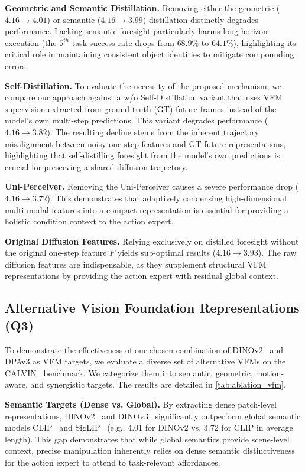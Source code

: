 \documentclass[runningheads]{llncs}
\begin{document}
\noindent \textbf{Geometric and Semantic Distillation.} 
Removing either the geometric ($4.16 \rightarrow 4.01$) or semantic ($4.16 \rightarrow 3.99$) distillation distinctly degrades performance. Lacking semantic foresight particularly harms long-horizon execution (the $5^{th}$ task success rate drops from $68.9\%$ to $64.1\%$), highlighting its critical role in maintaining consistent object identities to mitigate compounding errors.

\noindent \textbf{Self-Distillation.} To evaluate the necessity of the proposed mechanism, we compare our approach against a w/o Self-Distillation variant that uses VFM supervision extracted from ground-truth (GT) future frames instead of the model's own multi-step predictions. This variant degrades performance ($4.16 \rightarrow 3.82$). The resulting decline stems from the inherent trajectory misalignment between noisy one-step features and GT future representations, highlighting that self-distilling foresight from the model's own predictions is crucial for preserving a shared diffusion trajectory.

\noindent \textbf{Uni-Perceiver.} 
Removing the Uni-Perceiver causes a severe performance drop ($4.16 \rightarrow 3.72$). This demonstrates that adaptively condensing high-dimensional multi-modal features into a compact representation is essential for providing a holistic condition context to the action expert.

\noindent \textbf{Original Diffusion Features.} 
Relying exclusively on distilled foresight without the original one-step feature $F$ yields sub-optimal results ($4.16 \rightarrow 3.93$). The raw diffusion features are indispensable, as they supplement structural VFM representations by providing the action expert with residual global context.


\subsection{Alternative Vision Foundation Representations (Q3)}
\label{sec:ablation_vfm}

To demonstrate the effectiveness of our chosen combination of DINOv2~\cite{oquab2023dinov2} and DPAv3 as VFM targets, we evaluate a diverse set of alternative VFMs on the CALVIN~\cite{mees2022calvin} benchmark. We categorize them into semantic, geometric, motion-aware, and synergistic targets. The results are detailed in \cref{tab:ablation_vfm}.

\noindent \textbf{Semantic Targets (Dense vs. Global).} By extracting dense patch-level representations,
DINOv2~\cite{oquab2023dinov2} and DINOv3~\cite{simeoni2025dinov3} significantly outperform global semantic models CLIP~\cite{radford2021learning} and SigLIP~\cite{zhai2023sigmoid} (e.g., 4.01 for DINOv2 vs. 3.72 for CLIP in average length). This gap demonstrates that while global semantics provide scene-level context, precise manipulation inherently relies on dense semantic distinctiveness for the action expert to attend to task-relevant affordances. 
\end{document}
